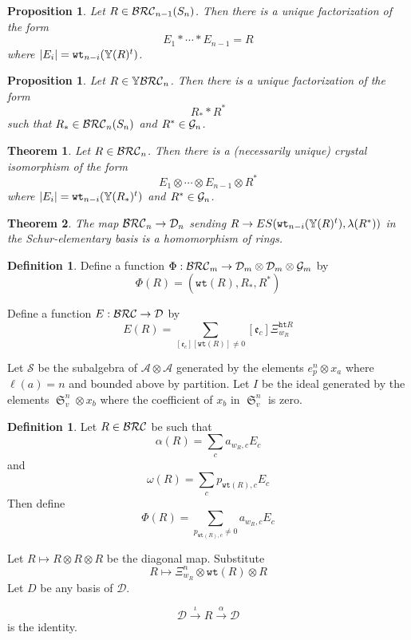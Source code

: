 \documentclass{amsart}
\newtheorem{proposition}[lemma]{Proposition}
\newtheorem{theorem}{Theorem}[section]
\theoremstyle{definition}
\newtheorem{definition}[lemma]{Definition}
\theoremstyle{remark}
\numberwithin{equation}{subsection}
\DeclareMathOperator{\sch}{\mathfrak{S}}
\newcommand{\wof}[1]{w_{#1}}
\newcommand{\wtt}{\mathtt{wt}}
\newcommand{\hr}{\mathtt{ht}}
\newcommand{\coma}{\mathcal{A}}
\newcommand{\dcoma}{\mathcal{D}}
\begin{document}
\begin{proposition}
Let $R\in \mathcal{BRC}_{n-1}(S_n)$. Then there is a unique factorization of the form
$$E_1*\cdots*E_{n-1}=R$$
where $|E_i|=\wtt_{n - i}(\hw(R)^t)$.
\end{proposition}

\begin{proposition}
Let $R\in \mathbb{Y}\mathcal{BRC}_n$. Then there is a unique factorization of the form
$$R_**R^*$$
such that $R_*\in\mathcal{BRC}_n(S_n)$ and $R^*\in \mathcal{G}_n$.
\end{proposition}

\begin{theorem}
Let $R\in \mathcal{BRC}_n$. Then there is a (necessarily unique) crystal isomorphism of the form
$$E_1\otimes\cdots\otimes E_{n-1} \otimes R^*$$
where $|E_i|=\wtt_{n - i}(\hw(R_*)^t)$ and $R^*\in \mathcal{G}_n$.
\end{theorem}

\begin{theorem}
The map $\BRC_n\to \dcoma_n$ sending $R\to ES(\wtt_{n-i}(\hw(R)^t),\lambda(R^*))$ in the Schur-elementary basis is a homomorphism of rings.
\end{theorem}

\begin{definition}
Define a function $\Phi:\BRC_m\to \dcoma_m\otimes \dcoma_{m}\otimes\grass_m$ by
$$\Phi(R) = (\wtt(R),R_*,R^*)$$
\end{definition}

Define a function $E:\BRC\to\dcoma$ by
$$E(R) = \sum_{[\mathfrak{e}_c][\wtt(R)]\neq 0}[\mathfrak{e}_c]\Xi_{\wof{R}}^{\hr{R}}$$

Let $\mathcal{S}$ be the subalgebra of $\coma\otimes\coma$ generated by the elements $e_p^n\otimes x_a$ where $\ell(a)=n$ and bounded above by partition. Let $I$ be the ideal generated by the elements $\sch_v^n\otimes x_b$ where the coefficient of $x_b$ in $\sch_v^n$ is zero.


\begin{definition}
Let $R\in \mathcal{BRC}$ be such that
$$\alpha(R) = \sum_c a_{\wof{R},c}E_{c}$$
and
$$\omega(R) = \sum_c p_{\wtt(R), c}E_c$$
Then define
$$\Phi(R) = \sum_{p_{\wtt(R),c}\neq 0} a_{\wof{R},c}E_c$$
\end{definition}

Let $R\mapsto R\otimes R\otimes R$ be the diagonal map. Substitute
$$R\mapsto \Xi_{\wof{R}}^n\otimes\wtt(R)\otimes R$$
Let $D$ be any basis of $\dcoma$.

$$\dcoma\xrightarrow{\iota} R\xrightarrow{\alpha} \dcoma$$
is the identity.
\end{document}
